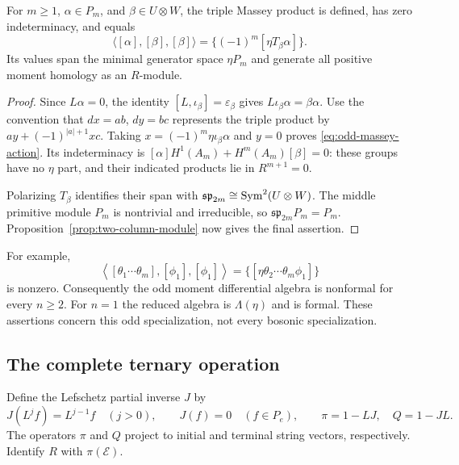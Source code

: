 \begin{theorem}
\label{thm:odd-massey-generation}
For $m\ge1$, $\alpha\in P_m$, and $\beta\in U\otimes W$, the triple
Massey product is defined, has zero indeterminacy, and equals
\begin{equation}\label{eq:odd-massey-action}
 \langle[\alpha],[\beta],[\beta]\rangle
       =\{(-1)^m[\eta T_\beta\alpha]\}.
\end{equation}
Its values span the minimal generator space $\eta P_m$ and generate
all positive moment homology as an $R$-module.
\end{theorem}
\begin{proof}
Since $L\alpha=0$, the identity
$[L,\iota_\beta]=\varepsilon_\beta$ gives
$L\iota_\beta\alpha=\beta\alpha$.
Use the convention that $dx=ab$, $dy=bc$ represents the triple
product by $ay+(-1)^{|a|+1}xc$.
Taking $x=(-1)^m\eta\iota_\beta\alpha$ and $y=0$ proves
\eqref{eq:odd-massey-action}. Its indeterminacy is
$[\alpha]H^1(A_m)+H^m(A_m)[\beta]=0$:
these groups have no $\eta$ part, and their indicated products lie
in $R^{m+1}=0$.

Polarizing $T_\beta$ identifies their span with
$\mathfrak{sp}_{2m}\cong\operatorname{Sym}^2(U\otimes W)$.
The middle primitive module $P_m$ is nontrivial and irreducible, so
$\mathfrak{sp}_{2m}P_m=P_m$.
Proposition~\ref{prop:two-column-module} now gives the final assertion.
\end{proof}

For example,
\[
 \left\langle[\theta_1\cdots\theta_m],[\phi_1],[\phi_1]\right\rangle
       =\{[\eta\theta_2\cdots\theta_m\phi_1]\}
\]
is nonzero. Consequently the odd moment differential algebra is
nonformal for every $n\ge2$.
For $n=1$ the reduced algebra is $\Lambda(\eta)$ and is formal.
These assertions concern this odd specialization, not every
bosonic specialization.

\subsection{The complete ternary operation}

Define the Lefschetz partial inverse $J$ by
\[
 J(L^jf)=L^{j-1}f\quad(j>0),\qquad J(f)=0\quad(f\in P_e),
 \qquad \pi=1-LJ,\quad Q=1-JL.
\]
The operators $\pi$ and $Q$ project to initial and terminal string
vectors, respectively. Identify $R$ with $\pi(\mathcal E)$.

